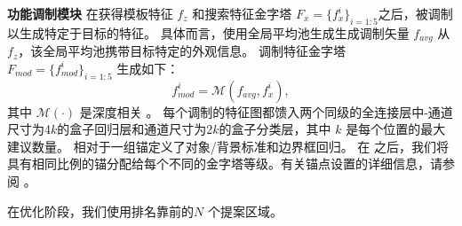 \textbf{功能调制模块} 在获得模板特征 $f_{z}$ 和搜索特征金字塔 $F_{x} = \{f_{x}^i\}_{i=1:5}$之后，被调制以生成特定于目标的特征。
具体而言，使用全局平均池生成生成调制矢量 $f_{avg}$ 从 $f_{z}$，该全局平均池携带目标特定的外观信息。
调制特征金字塔 $F_{mod} = \{f_{mod}^i\}_{i=1:5}$ 生成如下：
\begin{equation}
    f_{mod}^i = \mathcal{M}(f_{avg}, f^i_x),
\end{equation}
其中 $\mathcal M(\cdot)$ 是深度相关 \cite{SiamRPN++}。
每个调制的特征图都馈入两个同级的全连接层中-通道尺寸为4$k$的盒子回归层和通道尺寸为2$k$的盒子分类层，其中 $k$ 是每个位置的最大建议数量。
相对于一组锚定义了对象/背景标准和边界框回归。
在 \cite{lin2017feature}之后，我们将具有相同比例的锚分配给每个不同的金字塔等级。有关锚点设置的详细信息，请参阅 \cite{lin2017feature}。

在优化阶段，我们使用排名靠前的$N$ 个提案区域。

